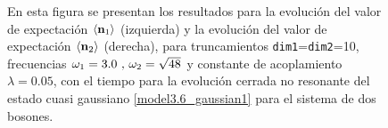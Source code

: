 \documentclass{report} %
\newcommand{\lgg}{\langle}
\newcommand{\rgg}{\rangle}
\numberwithin{equation}{section}
\begin{document}
\begin{figure}
    \centering
    \qquad
    \caption{En esta figura se presentan los resultados para la evolución del valor de expectación $\lgg {\bf n}_1 \rgg$ (izquierda) y la evolución del valor de expectación $\lgg {\bf n}_2 \rgg$ (derecha), para truncamientos \texttt{dim1}=\texttt{dim2}=10, frecuencias $\omega_1 = 3.0\textnormal{ , } \omega_2 =\sqrt{48}$ y constante de acoplamiento $\lambda = 0.05$, con el tiempo para la evolución cerrada no resonante del estado cuasi gaussiano \eqref{model3.6_gaussian1} para el sistema de dos bosones.}
    \label{ocupations_closed_nonres}
\end{figure}
\end{document}

